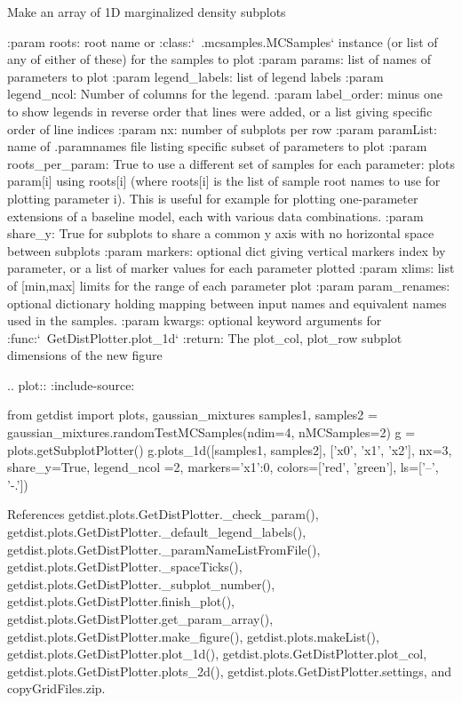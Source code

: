 \begin{DoxyVerb}Make an array of 1D marginalized density subplots 

:param roots: root name or :class:`~.mcsamples.MCSamples` instance (or list of any of either of these) for the samples to plot
:param params: list of names of parameters to plot
:param legend_labels: list of legend labels
:param legend_ncol: Number of columns for the legend.
:param label_order: minus one to show legends in reverse order that lines were added, or a list giving specific order of line indices 
:param nx: number of subplots per row 
:param paramList: name of .paramnames file listing specific subset of parameters to plot
:param roots_per_param: True to use a different set of samples for each parameter: 
      plots param[i] using roots[i] (where roots[i] is the list of sample root names to use for plotting parameter i). 
      This is useful for example for  plotting one-parameter extensions of a baseline model, each with various data combinations.
:param share_y: True for subplots to share a common y axis with no horizontal space between subplots
:param markers: optional dict giving vertical markers index by parameter, or a list of marker values for each parameter plotted
:param xlims: list of [min,max] limits for the range of each parameter plot
:param param_renames: optional dictionary holding mapping between input names and equivalent names used in the samples.
:param kwargs: optional keyword arguments for :func:`~GetDistPlotter.plot_1d`
:return: The plot_col, plot_row subplot dimensions of the new figure

.. plot::
   :include-source: 

    from getdist import plots, gaussian_mixtures
    samples1, samples2 = gaussian_mixtures.randomTestMCSamples(ndim=4, nMCSamples=2)
    g = plots.getSubplotPlotter()
    g.plots_1d([samples1, samples2], ['x0', 'x1', 'x2'], nx=3, share_y=True, legend_ncol =2,
         markers={'x1':0}, colors=['red', 'green'], ls=['--', '-.'])\end{DoxyVerb}
 

References getdist.\+plots.\+Get\+Dist\+Plotter.\+\_\+check\+\_\+param(), getdist.\+plots.\+Get\+Dist\+Plotter.\+\_\+default\+\_\+legend\+\_\+labels(), getdist.\+plots.\+Get\+Dist\+Plotter.\+\_\+param\+Name\+List\+From\+File(), getdist.\+plots.\+Get\+Dist\+Plotter.\+\_\+space\+Ticks(), getdist.\+plots.\+Get\+Dist\+Plotter.\+\_\+subplot\+\_\+number(), getdist.\+plots.\+Get\+Dist\+Plotter.\+finish\+\_\+plot(), getdist.\+plots.\+Get\+Dist\+Plotter.\+get\+\_\+param\+\_\+array(), getdist.\+plots.\+Get\+Dist\+Plotter.\+make\+\_\+figure(), getdist.\+plots.\+make\+List(), getdist.\+plots.\+Get\+Dist\+Plotter.\+plot\+\_\+1d(), getdist.\+plots.\+Get\+Dist\+Plotter.\+plot\+\_\+col, getdist.\+plots.\+Get\+Dist\+Plotter.\+plots\+\_\+2d(), getdist.\+plots.\+Get\+Dist\+Plotter.\+settings, and copy\+Grid\+Files.\+zip.



